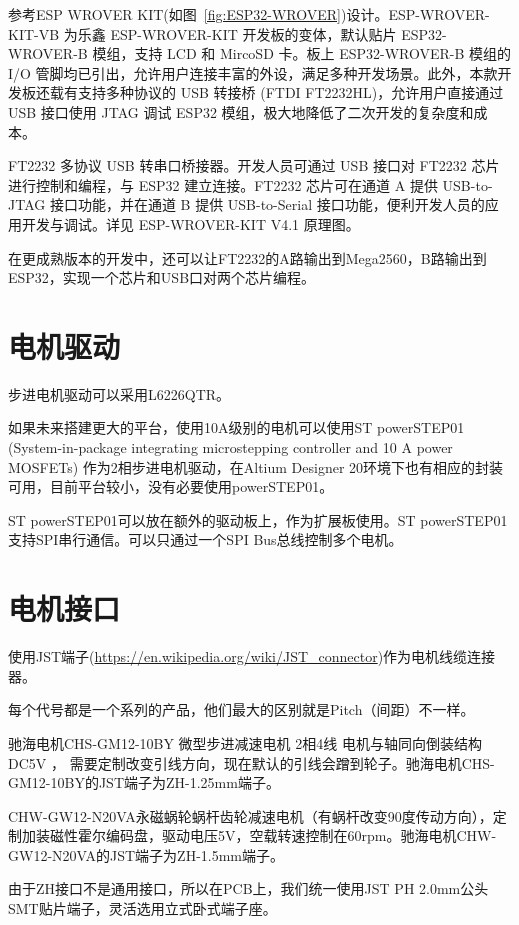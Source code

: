 参考ESP WROVER KIT(如图~\ref{fig:ESP32-WROVER})设计。ESP-WROVER-KIT-VB 为乐鑫 ESP-WROVER-KIT 开发板的变体，默认贴片 ESP32-WROVER-B 模组，支持 LCD 和 MircoSD 卡。板上 ESP32-WROVER-B 模组的 I/O 管脚均已引出，允许用户连接丰富的外设，满足多种开发场景。此外，本款开发板还载有支持多种协议的 USB 转接桥 (FTDI FT2232HL)，允许用户直接通过 USB 接口使用 JTAG 调试 ESP32 模组，极大地降低了二次开发的复杂度和成本。

FT2232 多协议 USB 转串口桥接器。开发人员可通过 USB 接口对 FT2232 芯片进行控制和编程，与 ESP32 建立连接。FT2232 芯片可在通道 A 提供 USB-to-JTAG 接口功能，并在通道 B 提供 USB-to-Serial 接口功能，便利开发人员的应用开发与调试。详见 ESP-WROVER-KIT V4.1 原理图。

在更成熟版本的开发中，还可以让FT2232的A路输出到Mega2560，B路输出到ESP32，实现一个芯片和USB口对两个芯片编程。

\section{电机驱动}

步进电机驱动可以采用L6226QTR。

如果未来搭建更大的平台，使用10A级别的电机可以使用ST powerSTEP01 (System-in-package integrating microstepping controller and
10 A power MOSFETs) 作为2相步进电机驱动，在Altium Designer 20环境下也有相应的封装可用，目前平台较小，没有必要使用powerSTEP01。

ST powerSTEP01可以放在额外的驱动板上，作为扩展板使用。ST powerSTEP01支持SPI串行通信。可以只通过一个SPI Bus总线控制多个电机。

\section{电机接口}

使用JST端子(\url{https://en.wikipedia.org/wiki/JST_connector})作为电机线缆连接器。

每个代号都是一个系列的产品，他们最大的区别就是Pitch（间距）不一样。

驰海电机CHS-GM12-10BY 微型步进减速电机 2相4线 电机与轴同向倒装结构 DC5V ， 需要定制改变引线方向，现在默认的引线会蹭到轮子。驰海电机CHS-GM12-10BY的JST端子为ZH-1.25mm端子。

CHW-GW12-N20VA永磁蜗轮蜗杆齿轮减速电机（有蜗杆改变90度传动方向），定制加装磁性霍尔编码盘，驱动电压5V，空载转速控制在60rpm。驰海电机CHW-GW12-N20VA的JST端子为ZH-1.5mm端子。

由于ZH接口不是通用接口，所以在PCB上，我们统一使用JST PH 2.0mm公头SMT贴片端子，灵活选用立式卧式端子座。


